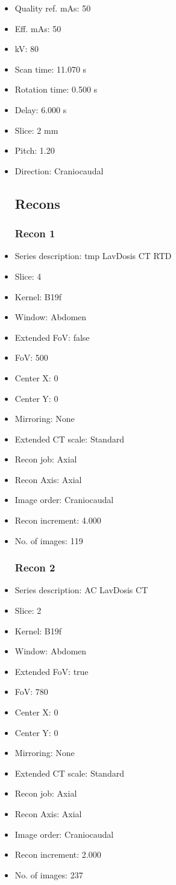 \documentclass[12pt]{article}
\begin{document}
\begin{itemize}
\subsection{Scan}
\item Quality ref. mAs: 50\item Eff. mAs: 50\item kV: 80\item Scan time: 11.070 s\item Rotation time: 0.500 s\item Delay: 6.000 s\item Slice: 2 mm\item Pitch: 1.20\item Direction: Craniocaudal\subsection{Recons}

\subsubsection{Recon 1}
\item Series description: tmp LavDosis CT RTD
\item Slice: 4
\item Kernel: B19f
\item Window: Abdomen
\item Extended FoV: false
\item FoV: 500
\item Center X: 0
\item Center Y: 0
\item Mirroring: None
\item Extended CT scale: Standard
\item Recon job: Axial
\item Recon Axis: Axial
\item Image order: Craniocaudal
\item Recon increment: 4.000
\item No. of images: 119
\subsubsection{Recon 2}
\item Series description: AC LavDosis CT
\item Slice: 2
\item Kernel: B19f
\item Window: Abdomen
\item Extended FoV: true
\item FoV: 780
\item Center X: 0
\item Center Y: 0
\item Mirroring: None
\item Extended CT scale: Standard
\item Recon job: Axial
\item Recon Axis: Axial
\item Image order: Craniocaudal
\item Recon increment: 2.000
\item No. of images: 237

\end{itemize}
\end{document}
